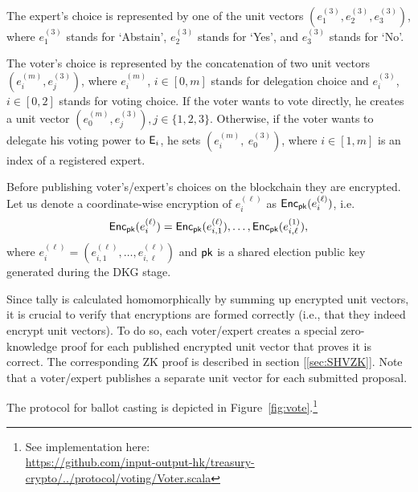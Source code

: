 The expert's choice  is represented by one of the unit vectors $(e^{(3)}_1, e^{(3)}_2, e^{(3)}_3)$, where $e^{(3)}_1$ stands for `Abstain', $e^{(3)}_2$ stands for `Yes', and $e^{(3)}_3$ stands for `No'.

The voter's choice is represented by the concatenation of two  unit vectors $( e^{(m)}_i , e^{(3)}_j )$, where $e^{(m)}_i$, $i\in[0,m]$ stands for delegation choice and $e^{(3)}_i$, $i\in[0,2]$ stands for voting choice. If the voter wants to vote directly, he creates a unit vector $( e^{(m)}_0 , e^{(3)}_j ), j \in \{1,2,3\}$. Otherwise, if the voter wants to delegate his voting power to $\mathsf{E}_i$, he sets $(e^{(m)}_i,\ e^{(3)}_0 )$, where $i \in [1,m]$ is an index of a registered expert. 

Before publishing voter's/expert's choices on the blockchain they are encrypted. Let us denote a coordinate-wise encryption of $e^{(\ell)}_i$ as $\mathsf{Enc}_{\mathsf{pk}}(e^{(\ell)}_i )$, i.e. 
\[\mathsf{Enc}_{\mathsf{pk}}(e^{(\ell)}_i ) = \mathsf{Enc}_{\mathsf{pk}}(e^{(\ell)}_{i,1}), \ldots, \mathsf{Enc}_{\mathsf{pk}}(e^{(1)}_{i,\ell}),\]
where $e^{(\ell)}_i = (e^{(\ell)}_{i,1},\ldots, e^{(\ell)}_{i,\ell})$ and $\mathsf{pk}$ is a shared election public key generated during the DKG stage.

Since tally is calculated homomorphically by summing up encrypted unit vectors, it is crucial to verify that encryptions are formed correctly (i.e., that they indeed encrypt unit vectors). To do so, each voter/expert creates a special zero-knowledge proof for each published encrypted unit vector that proves it is correct. The corresponding ZK proof is described in section [\ref{sec:SHVZK}].
Note that a voter/expert publishes a separate unit vector for each submitted proposal.

The protocol for ballot casting is depicted in Figure~\ref{fig:vote}.\footnote{See implementation here:\\ \href{https://github.com/input-output-hk/treasury-crypto/blob/master/src/main/scala/io/iohk/protocol/voting/Voter.scala}{https://github.com/input-output-hk/treasury-crypto/../protocol/voting/Voter.scala}}

